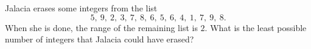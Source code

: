 Jalacia erases some integers from the list
\[
5,\ 9,\ 2,\ 3,\ 7,\ 8,\ 6,\ 5,\ 6,\ 4,\ 1,\ 7,\ 9,\ 8 .
\]
When she is done, the range of the remaining list is $2$. What is the least possible number of integers that Jalacia could have erased?
